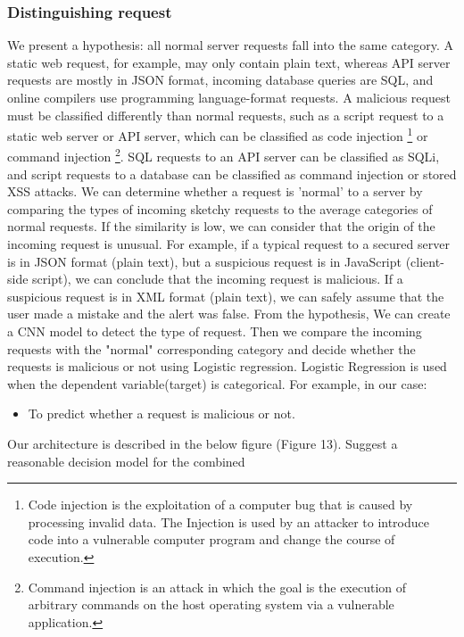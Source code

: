 \subsubsection{Distinguishing request }
\label{distinguishing request}
We present a hypothesis: all normal server requests fall into the same category. A static web request, for example, may only contain plain text, whereas API server requests are mostly in JSON format, incoming database queries are SQL, and online compilers use programming language-format requests. A malicious request must be classified differently than normal requests, such as a script request to a static web server or API server, which can be classified as code injection \footnote{Code injection is the exploitation of a computer bug that is caused by processing invalid data. The Injection is used by an attacker to introduce code into a vulnerable computer program and change the course of execution.}  or command injection \footnote{Command injection is an attack in which the goal is the execution of arbitrary commands on the host operating system via a vulnerable application.}. SQL requests to an API server can be classified as SQLi, and script requests to a database can be classified as command injection or stored XSS attacks. We can determine whether a request is 'normal' to a server by comparing the types of incoming sketchy requests to the average categories of normal requests. If the similarity is low, we can consider that the origin of the incoming request is unusual. For example, if a typical request to a secured server is in JSON format (plain text), but a suspicious request is in JavaScript (client-side script), we can conclude that the incoming request is malicious. If a suspicious request is in XML format (plain text), we can safely assume that the user made a mistake and the alert was false.\newline
From the hypothesis, We can create a CNN model to detect the type of request. Then we compare the incoming requests with the "normal" corresponding category and decide whether the requests is malicious or not using Logistic regression.\newline
Logistic Regression is used when the dependent variable(target) is categorical.\newline
For example, in our case: 
\begin{itemize}
    \item  To predict whether a request is malicious or not.
\end{itemize}
Our architecture is described in the below figure (Figure 13). Suggest a reasonable decision model for the combined 
